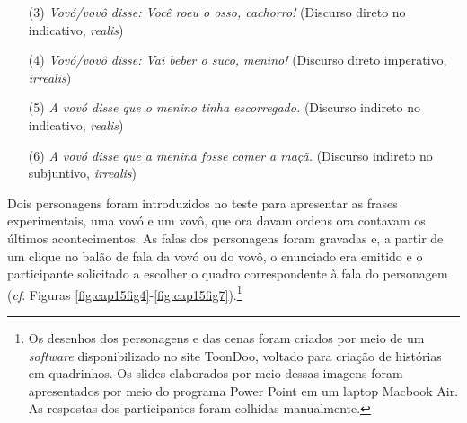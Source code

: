 \documentclass[output=paper,colorlinks,citecolor=brown,booklanguage=portuguese]{langscibook}
\begin{document}
\begin{enumerate}
    \item [(3)]	\emph{Vovó/vovô disse: Você roeu o osso, cachorro!} (Discurso direto no indicativo, \emph{realis})	
\item[(4)]	\emph{Vovó/vovô disse: Vai beber o suco, menino!} (Discurso direto imperativo, \emph{irrealis}) 
\item[(5)]	 \emph{A vovó disse que o menino tinha escorregado.} (Discurso indireto no indicativo, \emph{realis})
\item[(6)]	\emph{A vovó disse que a menina fosse comer a maçã.} (Discurso indireto no subjuntivo, \emph{irrealis})
\end{enumerate}
Dois personagens foram introduzidos no teste para apresentar as frases experimentais, uma vovó e um vovô, que ora davam ordens ora contavam os últimos acontecimentos. As falas dos personagens foram gravadas e, a partir de um clique no balão de fala da vovó ou do vovô, o enunciado era emitido e o participante solicitado a escolher o quadro correspondente à fala do personagem (\emph{cf}. Figuras \ref{fig:cap15fig4}-\ref{fig:cap15fig7}).\footnote{Os desenhos dos personagens e das cenas foram criados por meio de um \emph{software} disponibilizado no site ToonDoo, voltado para criação de histórias em quadrinhos. Os slides elaborados por meio dessas imagens foram apresentados por meio do programa Power Point em um laptop Macbook Air. As respostas dos participantes foram colhidas manualmente.}  



\begin{Figura}
\caption{~}
\end{Figura}


\begin{Figura}
  \caption{~}
\end{Figura}
\end{document}
